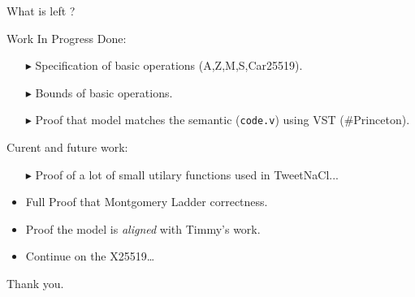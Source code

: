 \documentclass[8pt]{beamer}
\begin{document}
\begin{frame}[standout]
  \Huge What is left ?
\end{frame}

\begin{frame}[fragile]{Work In Progress}
    Done:
    \begin{itemize}
      \item[\color{ruDarkTeal}$\blacktriangleright$] Specification of basic operations (A,Z,M,S,Car25519).
      \item[\color{ruDarkTeal}$\blacktriangleright$] Bounds of basic operations.
      \item[\color{ruDarkTeal}$\blacktriangleright$] Proof that model matches the semantic (\texttt{code.v}) using VST (\#Princeton).
    \end{itemize}

    Curent and future work:
    \begin{itemize}
      \item[\color{ruDarkTeal}$\blacktriangleright$] Proof of a lot of small utilary functions used in TweetNaCl...
      \item Full Proof that Montgomery Ladder correctness.
      \item Proof the model is {\it aligned} with Timmy's work.
      \item Continue on the X25519\ldots
    \end{itemize}
\end{frame}





%
%
\begin{frame}[standout]
	\Huge Thank you.
\end{frame}
\end{document}

